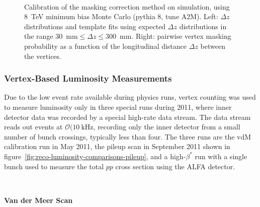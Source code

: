\begin{figure}[p]
{	}
	\\
	\caption{Calibration of the masking correction method on simulation, using 8~TeV minimum bias Monte Carlo (pythia 8, tune A2M). Left: $\Delta z$ distributions and template fits using expected $\Delta z$ distributions in the range $30$~mm$\leq\Delta z\leq300$~mm. Right: pairwise vertex masking probability as a function of the longitudinal distance $\Delta z$ between the vertices.}
	\label{fig:masking-correction-mc}
\end{figure}

\subsubsection{Vertex-Based Luminosity Measurements}
Due to the low event rate available during physics runs, vertex counting was used to measure luminosity only in three special runs during 2011, where inner detector data was recorded by a special high-rate data stream. The data stream reads out events at $\mathcal{O}(10~\mbox{kHz}$, recording only the inner detector from a small number of bunch crossings, typically less than four. The three runs are the vdM calibration run in May 2011, the pileup scan in September 2011 shown in figure~\ref{fig:reco-luminosity-comparisons-pileup}, and a high-$\beta^{*}$ run with a single bunch used to measure the total $pp$ cross section using the ALFA detector. 

\ 

\textbf{Van der Meer Scan}

